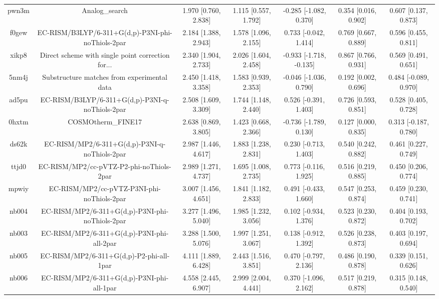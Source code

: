 \documentclass{article}
\begin{document}
\begin{center}
\begin{longtable}{|ccccccc|}
 pwn3m &                                     Analog\_search &  1.970 [0.760, 2.838] &  1.115 [0.557, 1.792] &   -0.285 [-1.082, 0.370] &  0.354 [0.016, 0.902] &   0.607 [0.137, 0.873] \\
 f0gew &  EC-RISM/B3LYP/6-311+G(d,p)-P3NI-phi-noThiols-2par &  2.184 [1.388, 2.943] &  1.578 [1.096, 2.155] &    0.733 [-0.042, 1.414] &  0.769 [0.667, 0.889] &   0.596 [0.455, 0.811] \\
 xikp8 &  Direct scheme with single point correction for... &  2.340 [1.904, 2.733] &  2.026 [1.604, 2.458] &  -0.933 [-1.718, -0.135] &  0.867 [0.766, 0.931] &   0.569 [0.491, 0.651] \\
 5nm4j &        Substructure matches from experimental data &  2.450 [1.418, 3.358] &  1.583 [0.939, 2.353] &   -0.046 [-1.036, 0.790] &  0.192 [0.002, 0.696] &  0.484 [-0.089, 0.970] \\
 ad5pu &    EC-RISM/B3LYP/6-311+G(d,p)-P3NI-q-noThiols-2par &  2.508 [1.609, 3.309] &  1.744 [1.148, 2.440] &    0.526 [-0.391, 1.403] &  0.726 [0.593, 0.851] &   0.528 [0.405, 0.728] \\
 0hxtm &                                 COSMOtherm\_FINE17 &  2.638 [0.869, 3.805] &  1.423 [0.668, 2.366] &   -0.736 [-1.789, 0.130] &  0.127 [0.000, 0.835] &  0.313 [-0.187, 0.780] \\
 ds62k &      EC-RISM/MP2/6-311+G(d,p)-P3NI-q-noThiols-2par &  2.987 [1.446, 4.617] &  1.883 [1.238, 2.831] &    0.230 [-0.713, 1.403] &  0.540 [0.242, 0.882] &   0.461 [0.227, 0.749] \\
 ttjd0 &           EC-RISM/MP2/cc-pVTZ-P2-phi-noThiols-2par &  2.989 [1.271, 4.737] &  1.695 [1.008, 2.735] &    0.773 [-0.116, 1.925] &  0.516 [0.219, 0.885] &   0.450 [0.206, 0.774] \\
 mpwiy &         EC-RISM/MP2/cc-pVTZ-P3NI-phi-noThiols-2par &  3.007 [1.456, 4.651] &  1.841 [1.182, 2.833] &    0.491 [-0.433, 1.660] &  0.547 [0.253, 0.874] &   0.459 [0.230, 0.741] \\
 nb004 &    EC-RISM/MP2/6-311+G(d,p)-P3NI-phi-noThiols-2par &  3.277 [1.496, 5.040] &  1.985 [1.232, 3.056] &    0.102 [-0.934, 1.376] &  0.523 [0.230, 0.872] &   0.404 [0.193, 0.702] \\
 nb003 &         EC-RISM/MP2/6-311+G(d,p)-P3NI-phi-all-2par &  3.288 [1.500, 5.076] &  1.997 [1.251, 3.067] &    0.138 [-0.912, 1.392] &  0.526 [0.238, 0.873] &   0.403 [0.197, 0.694] \\
 nb005 &           EC-RISM/MP2/6-311+G(d,p)-P2-phi-all-1par &  4.111 [1.889, 6.428] &  2.443 [1.516, 3.851] &    0.470 [-0.797, 2.136] &  0.486 [0.190, 0.878] &   0.339 [0.151, 0.626] \\
 nb006 &         EC-RISM/MP2/6-311+G(d,p)-P3NI-phi-all-1par &  4.558 [2.445, 6.907] &  2.999 [2.004, 4.441] &    0.370 [-1.096, 2.162] &  0.517 [0.219, 0.878] &   0.315 [0.148, 0.540] \\
\end{longtable}
\end{center}
\end{document}
